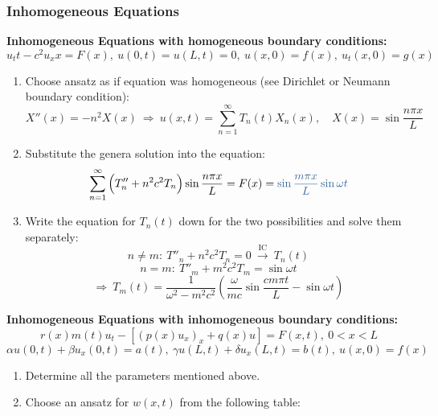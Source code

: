 \documentclass[a4paper]{article}
\begin{document}
\begin{twocolumn}
\subsubsection{Inhomogeneous Equations}

\textbf{Inhomogeneous Equations with homogeneous boundary conditions:}
$$u_tt - c^2 u_xx = F(x),\  u(0,t) = u(L,t) = 0, \ u(x,0) = f(x), \ u_t(x,0) = g(x)$$

\begin{enumerate}
	\item Choose ansatz as if equation was homogeneous (see Dirichlet or Neumann boundary condition):
	$$X''(x) = -n^2 X(x) \ \Rightarrow \ u(x,t) = \sum_{n=1}^{\infty} T_n(t) X_n(x), \quad X(x) = \sin \frac{n \pi x}{L}$$
	\item Substitute the genera solution into the equation:
	$$\sum_{n=1}^{\infty} \left( T''_n + n^2 c^2 T_n \right) \sin \frac{n \pi x}{L} = F(x) = \ex{\sin \frac{m \pi x}{L} \sin \omega t}$$
	\item Write the equation for $T_n(t)$ down for the two possibilities and solve them separately:
	$$n \neq m: \ T''_n + n^2 c^2 T_n = 0 \ \xrightarrow{\text{IC}} \  T_n(t)$$
	$$n = m: \ T''_m +m^2 c^2 T_m =\sin \omega t$$
	$$\Rightarrow \ T_m(t) = \frac{1}{\omega^2 - m^2 c^2} \left( \frac{\omega}{m c} \sin \frac{c m \pi t}{L} - \sin \omega t \right)$$
\end{enumerate}

\textbf{Inhomogeneous Equations with inhomogeneous boundary conditions:}
$$r(x)m(t)u_t - \left[ (p(x)u_x)_x + q(x) u \right] = F(x,t), \ 0 < x < L$$
$$\alpha u(0,t) + \beta u_x(0,t) = a(t), \ \gamma u(L,t) + \delta u_x(L,t) = b(t), \ u(x,0) = f(x)$$


\begin{enumerate}
	\item Determine all the parameters mentioned above.
	\item Choose an ansatz for $w(x,t)$ from the following table:
	

\end{enumerate}
\end{twocolumn}
\end{document}
